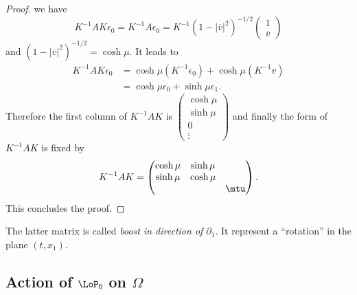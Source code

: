 \begin{proof}
we have
\[
  K^{-1}AK\epsilon_0=K^{-1}A\epsilon_0=K^{-1}(1-|\overline{v}|^2)^{-1/2}
\begin{pmatrix}
1\\\overline{v}
\end{pmatrix}
\]
and $(1-|\overline{v}|^2)^{-1/2}=\cosh\mu$. It leads to
\[
\begin{split}
K^{-1}AK\epsilon_0&=\cosh\mu(K^{-1}\epsilon_0)+\cosh\mu(K^{-1}v)\\
		&=\cosh\mu\epsilon_0+\sinh\mu\epsilon_1.
\end{split}
\]
Therefore the first column of $K^{-1}AK$ is
$
\begin{pmatrix}
\cosh\mu\\\sinh\mu\\0\\\vdots
\end{pmatrix}
$ and finally the form of $K^{-1}AK$ is fixed by
\[
  K^{-1}AK=
\begin{pmatrix}
\cosh\mu&\sinh\mu\\\sinh\mu&\cosh\mu\\&&\mtu
\end{pmatrix}.
\]
This concludes the proof.

\end{proof}
The latter matrix is called \emph{boost in direction of $\partial_1$}. It represent a ``rotation'' in the plane $(t,x_1)$.

\subsection{Action of \texorpdfstring{$\LoP_0$}{L0} on \texorpdfstring{$\Omega$}{O}}


